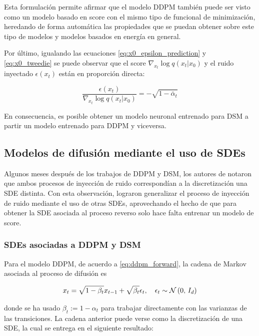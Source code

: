 Esta formulación permite afirmar que el modelo DDPM también puede ser visto como un modelo basado en score con el mismo tipo de funcional de minimización, heredando de forma automática las propiedades que se puedan obtener sobre este tipo de modelos y modelos basados en energía en general.

Por último, igualando las ecuaciones \eqref{eq:x0_epsilon_prediction} y \eqref{eq:x0_tweedie} se puede observar que el score $\nabla_{x_t}\log q(x_t|x_0)$ y el ruido inyectado $\epsilon(x_t)$ están en proporción directa:

\begin{equation*}
    \frac{\epsilon(x_t)}{\nabla_{x_t}\log q(x_t|x_0)} = -\sqrt{1-\bar\alpha_t}
\end{equation*}

En consecuencia, es posible obtener un modelo neuronal entrenado para DSM a partir un modelo entrenado para DDPM y viceversa.

\subsection{Modelos de difusión mediante el uso de SDEs}
\label{dm/continuous_dm/sde_dm}

Algunos meses después de los trabajos de DDPM y DSM, los autores de \cite{song2021scorebased} notaron que ambos procesos de inyección de ruido correspondían a la discretización una SDE distinta. Con esta observación, lograron generalizar el proceso de inyección de ruido mediante el uso de otras SDEs, aprovechando el hecho de que para obtener la SDE asociada al proceso reverso solo hace falta entrenar un modelo de score.

\subsubsection{SDEs asociadas a DDPM y DSM}

Para el modelo DDPM, de acuerdo a \eqref{eq:ddpm_forward}, la cadena de Markov asociada al proceso de difusión es

\begin{equation}
    \label{eq:ddpm_forward_variance}
    x_t = \sqrt{1-\beta_t} x_{t-1} + \sqrt{\beta_t} \epsilon_t,\quad \epsilon_t\sim\mathcal{N}\left(0,\,I_d\right)
\end{equation}

donde se ha usado $\beta_t:=1-\alpha_t$ para trabajar directamente con las varianzas de las transiciones. La cadena anterior puede verse como la discretización de una SDE, la cual se entrega en el siguiente resultado:

